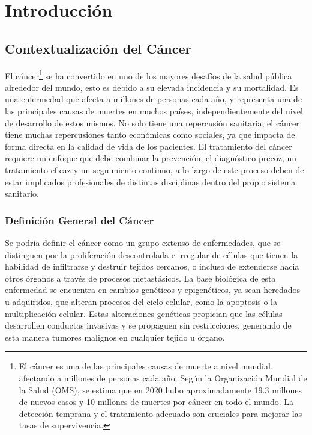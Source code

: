 
\chapter{Introducción}

\section{Contextualización del Cáncer}
\label{sec:context-cancer}

El cáncer\footnote{El cáncer es una de las principales causas de muerte a nivel mundial, afectando a millones de personas cada año. Según la Organización Mundial de la Salud (OMS), se estima que en 2020 hubo aproximadamente 19.3 millones de nuevos casos y 10 millones de muertes por cáncer en todo el mundo. La detección temprana y el tratamiento adecuado son cruciales para mejorar las tasas de supervivencia.} se ha convertido en uno de los mayores desafíos de la salud pública alrededor del mundo, esto es debido a su elevada incidencia y su mortalidad. Es una enfermedad que afecta a millones de personas cada año, y representa una de las principales causas de muertes en muchos países, independientemente del nivel de desarrollo de estos mismos. No solo tiene una repercusión sanitaria, el cáncer tiene muchas repercusiones tanto económicas como sociales, ya que impacta de forma directa en la calidad de vida de los pacientes. El tratamiento del cáncer requiere un enfoque que debe combinar la prevención, el diagnóstico precoz, un tratamiento eficaz y un seguimiento continuo, a lo largo de este proceso deben de estar implicados profesionales de distintas disciplinas dentro del propio sistema sanitario. 

\subsection{Definición General del Cáncer}
\label{sec:def-cancer}

Se podría definir el cáncer como un grupo extenso de enfermedades, que se distinguen por la proliferación descontrolada e irregular de células que tienen la habilidad de infiltrarse y destruir tejidos cercanos, o incluso de extenderse hacia otros órganos a través de procesos metastásicos\cite{WHO2025}. La base biológica de esta enfermedad se encuentra en cambios genéticos y epigenéticos, ya sean heredados u adquiridos, que alteran procesos del ciclo celular, como la apoptosis o la multiplicación celular. Estas alteraciones genéticas propician que las células desarrollen conductas invasivas y se propaguen sin restricciones, generando de esta manera tumores malignos en cualquier tejido u órgano. 

